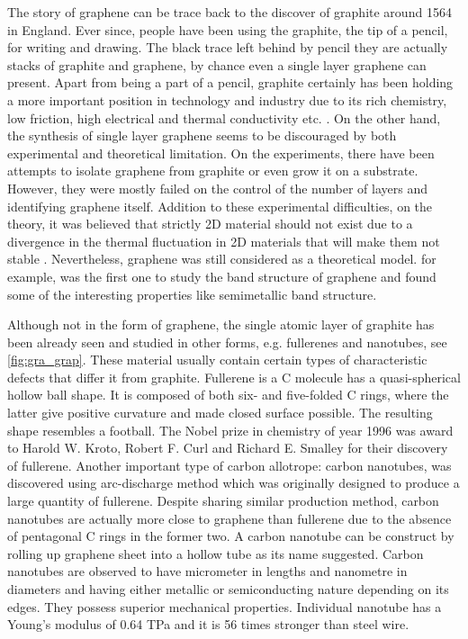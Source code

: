 The story of graphene can be trace back to the discover of graphite around 1564 in England\cite{petroski1990pencil}. Ever since, people have been using the graphite, the tip of a pencil, for writing and drawing. The black trace left behind by pencil they are actually stacks of graphite and graphene, by chance even a single layer graphene can present.  Apart from being a part of a pencil, graphite certainly has been holding a more important position in technology and industry due to its rich chemistry, low friction, high electrical and thermal conductivity etc. . On the other hand, the synthesis of single layer graphene seems to be discouraged by both experimental and theoretical limitation. On the experiments, there have been attempts\cite{Krishnan1997,Ohashi1997,Dresselhaus2002,Shioyama2001} to isolate graphene from graphite or even grow it on a substrate. However, they were mostly failed on the control of the number of layers and identifying graphene itself.  Addition to these experimental difficulties, on the theory, it was believed that strictly 2D material should not exist due to a divergence in the thermal fluctuation in 2D materials that will make them not stable \cite{Peierls1935,Landau1937,Mermin1968}. Nevertheless, graphene was still considered as a theoretical model. for example, \citet{Wallace1947} was the first one to study the band structure of graphene \cite{CastroNeto2009} and found some of the interesting properties like semimetallic band structure. 

Although not in the form of graphene, the single atomic layer of graphite has been already seen and studied in other forms, e.g. fullerenes and nanotubes, see \autoref{fig:gra_grap}. These material usually contain certain types of characteristic defects that differ it from graphite.  Fullerene is a C molecule has a quasi-spherical hollow ball shape. It is composed of both six- and five-folded C rings, where the latter give positive curvature and made closed surface possible. The resulting shape resembles a football\cite{Kroto1985,Lamb1990}. The Nobel prize in chemistry of year 1996 was award to Harold W. Kroto, Robert F. Curl and Richard E. Smalley for their discovery of fullerene. Another important type of carbon allotrope: carbon nanotubes\cite{Iijima1993}, was discovered using arc-discharge method\cite{Lamb1990} which was originally designed to produce a large quantity of fullerene. Despite sharing similar production method, carbon nanotubes are actually more close to graphene than fullerene due to the absence of pentagonal C rings in the former two. A carbon nanotube can be construct by rolling up graphene sheet into a hollow tube as its name suggested. Carbon nanotubes are observed to have micrometer in lengths and nanometre in diameters and having either metallic or semiconducting nature depending on its edges. They possess superior mechanical properties. Individual nanotube has a Young's modulus of 0.64 TPa and it is 56 times stronger than steel wire\cite{Baughman787}.

